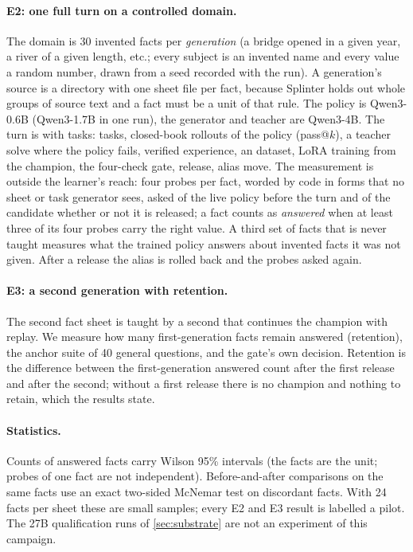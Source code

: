 \paragraph{E2: one full turn on a controlled domain.} The domain is 30 invented facts per
\emph{generation} (a bridge opened in a given year, a river of a given length, etc.; every
subject is an invented name and every value a random number, drawn from a seed recorded with
the run). A generation's source is a directory with one sheet file per fact, because Splinter
holds out whole groups of source text and a fact must be a unit of that rule. The policy is
Qwen3-0.6B (Qwen3-1.7B in one run), the generator and teacher are Qwen3-4B. The turn is
 with  tasks: tasks, closed-book rollouts of the policy
(pass@$k$), a teacher solve where the policy fails, verified experience, an 
dataset, LoRA training from the champion, the four-check gate, release, alias move. The
measurement is outside the learner's reach: four probes per fact, worded by code in forms that no
sheet or task generator sees, asked of the live policy  before the turn and
of the candidate whether or not it is released; a fact counts as \emph{answered} when at least
three of its four probes carry the right value. A third set of facts that is never taught
measures what the trained policy answers about invented facts it was not given. After a release
the alias is rolled back and the probes asked again.

\paragraph{E3: a second generation with retention.} The second fact sheet is taught by a
second  that continues the champion with replay. We measure how many
first-generation facts remain answered (retention), the anchor suite of 40 general
questions, and the gate's own decision. Retention is the difference between the
first-generation answered count after the first release and after the second; without a first
release there is no champion and nothing to retain, which the results state.

\paragraph{Statistics.} Counts of answered facts carry Wilson 95\% intervals (the facts
are the unit; probes of one fact are not independent). Before-and-after comparisons on the
same facts use an exact two-sided McNemar test on discordant facts. With 24 facts per
sheet these are small samples; every E2 and E3 result is labelled a pilot. The 27B qualification runs of \cref{sec:substrate} are not an experiment of this campaign.
